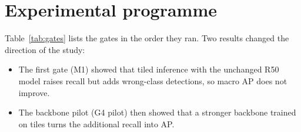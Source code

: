 \section{Experimental programme}\label{sec:programme}

Table~\ref{tab:gates} lists the gates in the order they ran. Two results changed the direction of the study:
\begin{itemize}
\item The first gate (M1) showed that tiled inference with the unchanged R50 model raises recall but adds wrong-class detections, so macro AP does not improve.
\item The backbone pilot (G4 pilot) then showed that a stronger backbone trained on tiles turns the additional recall into AP.
\end{itemize}

